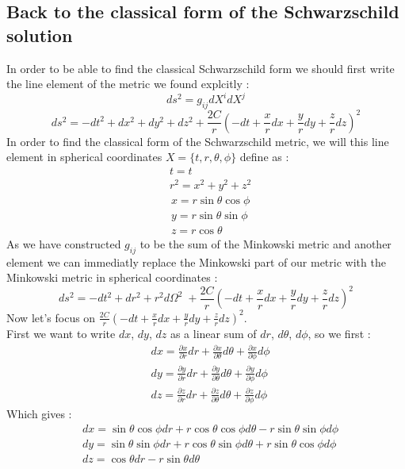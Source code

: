 \documentclass[a4paper,12pt]{article}
\theoremstyle{definition}
\begin{document}
\subsection{Back to the classical form of the Schwarzschild solution}
In order to be able to find the classical Schwarzschild form we should first write the line element of the metric we found explcitly :
\begin{equation}
	ds^2=g_{ij}dX^idX^j
\end{equation}
\begin{equation}
	ds^2=-dt^2+dx^2+dy^2+dz^2+\frac{2C}{r}(-dt+\frac{x}{r}dx+\frac{y}{r}dy+\frac{z}{r}dz)^2
\end{equation}
In order to find the classical form of the Schwarzschild metric, we will this line element in spherical coordinates $X=\{t,r,\theta,\phi\}$ define as :
\begin{align}
	&t=t\\
	&r^2=x^2+y^2+z^2
\end{align}
\begin{align}
	&x=r\sin{\theta}\cos{\phi}\label{coord-transform-1}\\
	&y=r\sin{\theta}\sin{\phi}\\
	&z=r\cos{\theta}\label{coord-transform-3}
\end{align}
As we have constructed $g_{ij}$ to be the sum of the Minkowski metric and another element we can immediatly replace the Minkowski part of our metric with the Minkowski metric in spherical coordinates :
\begin{equation} \label{line-elem-schwarz}
	ds^2=-dt^2+dr^2+r^2d\Omega^2\;+\frac{2C}{r}(-dt+\frac{x}{r}dx+\frac{y}{r}dy+\frac{z}{r}dz)^2
\end{equation} 
Now let's focus on $\frac{2C}{r}(-dt+\frac{x}{r}dx+\frac{y}{r}dy+\frac{z}{r}dz)^2$.\\
First we want to write $dx$, $dy$, $dz$ as a linear sum of $dr$, $d\theta$, $d\phi$, so we first :
\begin{align}
	&dx=\frac{\partial x}{\partial r}dr+\frac{\partial x}{\partial \theta}d\theta+\frac{\partial x}{\partial \phi}d\phi\\
	&dy=\frac{\partial y}{\partial r}dr+\frac{\partial y}{\partial \theta}d\theta+\frac{\partial y}{\partial \phi}d\phi\\
	&dz=\frac{\partial z}{\partial r}dr+\frac{\partial z}{\partial \theta}d\theta+\frac{\partial z}{\partial \phi}d\phi
\end{align}
Which gives :
\begin{align}
	&dx=\sin{\theta}\cos{\phi}dr+r\cos{\theta}\cos{\phi}d\theta-r\sin{\theta}\sin{\phi}d\phi \\
	&dy=\sin{\theta}\sin{\phi}dr+r\cos{\theta}\sin{\phi}d\theta+r\sin{\theta}\cos{\phi}d\phi \\
	&dz=\cos{\theta}dr-r\sin{\theta}d\theta
\end{align}
\end{document}
